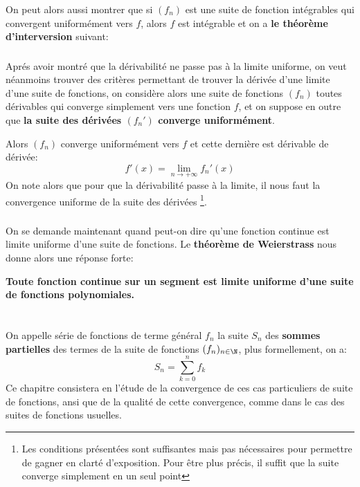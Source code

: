 \subsection*{}
On peut alors aussi montrer que si \((f_n)\) est une suite de fonction intégrables qui convergent uniformément vers \(f\), alors \(f\) est intégrable et on a \textbf{le théorème d'interversion} suivant:
\subsection*{}
Aprés avoir montré que la dérivabilité ne passe pas à la limite uniforme, on veut néanmoins trouver des critères permettant de trouver la dérivée d'une limite d'une suite de fonctions, on considère alors une suite de fonctions \((f_n)\) toutes dérivables qui converge simplement vers une fonction \(f\), et on suppose en outre que \textbf{la suite des dérivées \((f_n')\) converge uniformément}.\<

Alors \((f_n)\) converge uniformément vers \(f\) et cette dernière est dérivable de dérivée:
\[
   f'(x) = \lim_{n \rightarrow +\infty} f_n'(x)
\] 
On note alors que pour que la dérivabilité passe à la limite, il nous faut la convergence uniforme de la suite des dérivées \footnote[1]{Les conditions présentées sont suffisantes mais pas nécessaires pour permettre de gagner en clarté d'exposition. Pour être plus précis, il suffit que la suite converge simplement en un seul point}.
\subsection*{}
On se demande maintenant quand peut-on dire qu'une fonction continue est limite uniforme d'une suite de fonctions. Le \textbf{théorème de Weierstrass} nous donne alors une réponse forte:
\begin{center}
   \textbf{Toute fonction continue sur un segment est limite uniforme d'une suite de fonctions polynomiales.}
\end{center}
\chapter*{}
On appelle série de fonctions de terme général \(f_n\) la suite \(S_n\) des \textbf{sommes partielles} des termes de la suite de fonctions \((f_n)_{n\in\N}\), plus formellement, on a:
\[
   S_n = \sum_{k=0}^{n} f_k   
\]
Ce chapitre consistera en l'étude de la convergence de ces cas particuliers de suite de fonctions, ansi que de la qualité de cette convergence, comme dans le cas des suites de fonctions usuelles. 
